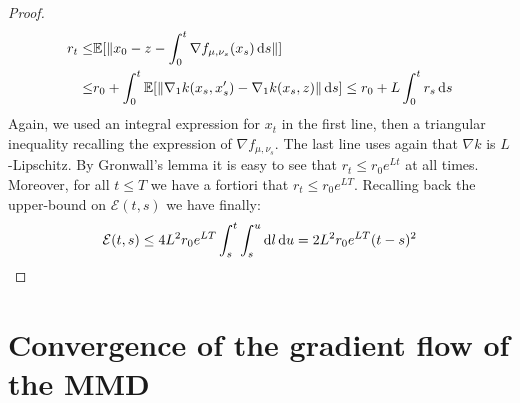 \begin{proof}
	\begin{align*}
		r_t\leq & \mathbb{E}[\Vert x_0  - z -\int_0^t \nabla f_{\mu,\nu_s}(x_s) \mathop{}\!\mathrm{d} s \Vert]\\
		\leq &
		r_0 +\int_0^t \mathbb{E}[\Vert \nabla_1 k(x_s,x_s')- \nabla_1 k(x_s,z) \Vert \mathop{}\!\mathrm{d} s]\leq 
		r_0  + L\int_0^t r_s \mathop{}\!\mathrm{d} s
	\end{align*}
	Again, we used an integral expression for $x_t$ in the first line, then a triangular inequality recalling the expression of $\nabla f_{\mu,\nu_s}$. The last line uses again that $\nabla k$ is $L$-Lipschitz. By Gronwall's lemma it is easy to see that $r_t \leq r_0e^{Lt}$ at all times. Moreover, for all $t\leq T$ we have a fortiori  that $r_t \leq r_0 e^{LT}$.
	Recalling back the upper-bound on $\mathcal{E}(t,s)$ we have finally:
	\[
	\mathcal{E}(t,s)\leq 4L^2 r_0 e^{LT} \int_{s}^t \int_s^u \mathop{}\!\mathrm{d} l \mathop{}\!\mathrm{d} u = 2L^2 r_0 e^{LT}(t-s)^2
	\] 
\end{proof}



%	
%	
%	
%



\section{Convergence of the gradient flow of the MMD}\label{sec:appendix_convergence}



